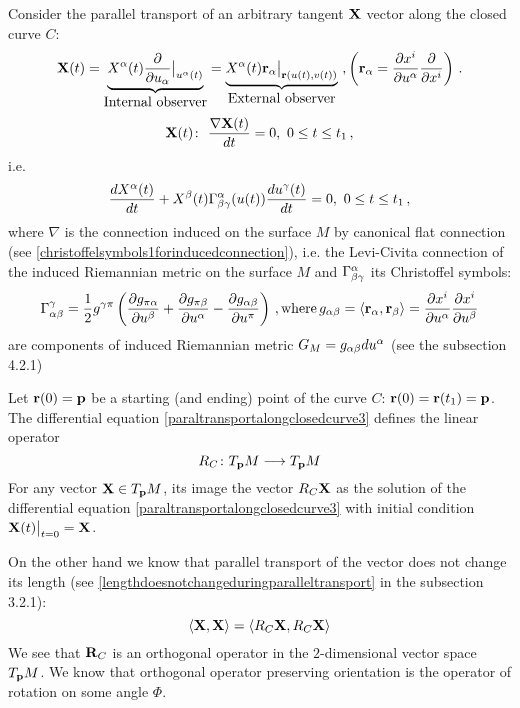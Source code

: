 \documentclass[12pt]{article}
\theoremstyle{theorem}
\numberwithin{equation}{section}
\begin{document}
Consider the parallel transport of an arbitrary tangent ${\bf X}$ vector along the closed curve $C$:
          \begin{equation*}\label{paraltransportalongclosedcurve1}
{\bf X}(t)= \underbrace {X^\alpha(t){\partial\over \partial u_\alpha}\big\vert_{u^\alpha(t)}}_{\hbox{Internal observer}} =
 \underbrace{X^\alpha(t){\bf r}_\alpha\big\vert_{{\bf r}(u(t),v(t))}}_{\hbox{External observer}}\,\,,\left(
 {\bf r}_\alpha={\partial x^i\over \partial u^\alpha}{\partial\over \partial x^i}\right)\,.
          \end{equation*}
          \begin{equation*}\label{paraltransportalongclosedcurve2}
{\bf X}(t)\colon\,\, {\nabla {\bf X}(t)\over dt}=0,\,\, 0\leq t\leq t_1\,,
          \end{equation*}
i.e.
                \begin{equation}\label{paraltransportalongclosedcurve3}
{d X^\alpha(t)\over dt}+
X^\beta(t)\Gamma^\alpha_{\beta\gamma}(u(t))
{du^\gamma(t)\over dt}=0,\,\, 0\leq t\leq t_1\,,
          \end{equation}
where $\nabla$ is the connection induced on the surface $M$ by canonical flat connection
(see \eqref{christoffelsymbols1forinducedconnection}), i.e.
the Levi-Civita connection of the induced Riemannian metric on the surface $M$
 and $\Gamma^\alpha_{\beta\gamma}$ its Christoffel symbols:
\begin{equation}\label{connectioninduced12}
          \Gamma^\gamma_{\alpha\beta}={1\over 2}g^{\gamma\pi}
      \left({\partial g_{\pi \alpha}\over \partial u^\beta}+{\partial g_{\pi \beta}\over \partial u^\alpha}-
      {\partial g_{\alpha\beta}\over \partial u^\pi}\right)\,,{\rm where}\,
      g_{\alpha\beta}=\langle{\bf r}_\alpha,{\bf r}_\beta\rangle={\partial x^i\over \partial u^\alpha} {\partial x^i\over \partial u^\beta}
     \end{equation}
 are components of induced Riemannian metric
 $G_M=g_{\alpha\beta}du^\alpha$    (see the subsection 4.2.1)


Let ${\bf r}(0)={\bf p}$ be a starting (and ending) point of the curve $C$: ${\bf r}(0)={\bf r}(t_1)={\bf p}$.
The differential equation \eqref{paraltransportalongclosedcurve3} defines the linear operator
            \begin{equation}\label{linearoperatoroverclosedcurve}
            R_C\colon T_{{\bf p}}M\longrightarrow T_{{\bf p}}M
            \end{equation}
For any vector ${\bf X}\in T_{{\bf p}}M$, its image the vector $R_C{\bf X}$ as the solution of the differential equation
\eqref{paraltransportalongclosedcurve3} with initial condition ${\bf X}(t)\big\vert_{t=0}={\bf X}$.

On the other hand we know that parallel transport of the vector does not change its length (see
\eqref{lengthdoesnotchangeduringparalleltransport} in the subsection 3.2.1):
       \begin{equation}\label{linearoperatoroverclosedcurvescalarproduct}
            \langle{\bf X},{\bf X}\rangle=\langle R_C{\bf X},R_C{\bf X}\rangle
            \end{equation}
We see that ${\bf R}_C$ is an orthogonal operator in the $2$-dimensional vector space $T_{{\bf p}}M$.
We know that orthogonal operator preserving orientation is the operator of rotation on some angle $\Phi$.
\end{document}

